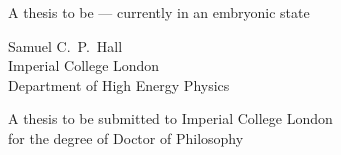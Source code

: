 
\begin{titlepage}

\vspace*{-1.5cm}

\vspace*{5.0cm}

{\bf\boldmath\huge
\begin{center}
  A thesis to be --- currently in an embryonic state
\end{center}
}

\vspace*{2.0cm}

\begin{center}
  \Large
Samuel C.~P.~Hall
\bigskip\\
Imperial College London\\
Department of High Energy Physics
\end{center}

\vspace{\fill}

\vspace*{2.0cm}
\begin{center}
  A thesis to be submitted to Imperial College London\\
  for the degree of Doctor of Philosophy
\end{center}
\vspace{\fill}

\end{titlepage}




\newpage
\pagestyle{fancy}  %
\setcounter{page}{1}
\mbox{~}

\cleardoublepage
